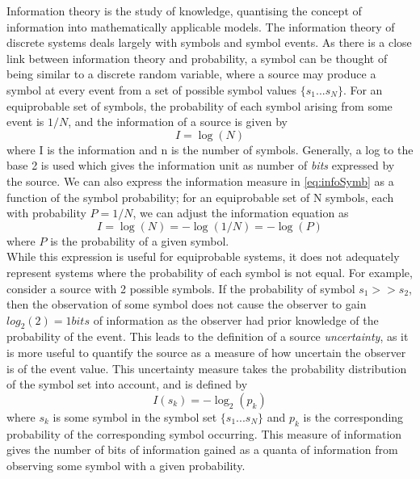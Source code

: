 Information theory is the study of knowledge, quantising the concept of information into mathematically applicable models. The information theory of discrete systems deals largely with symbols and symbol events. As there is a close link between information theory and probability, a symbol can be thought of being similar to a discrete random variable, where a source may produce a symbol at every event from a set of possible symbol values $\{s_{1}...s_{N}\}$. For an equiprobable set of symbols, the probability of each symbol arising from some event is $1/N$, and the information of a source is given by 
\begin{equation}
    \label{eq:infoSymb}
    I = \log(N)
\end{equation}
where I is the information and n is the number of symbols. Generally, a log to the base 2 is used which gives the information unit as number of \emph{bits} expressed by the source. We can also express the information measure in \ref{eq:infoSymb} as a function of the symbol probability; for an equiprobable set of N symbols, each with probability $P = 1/N$, we can adjust the information equation as
\begin{equation}
    \label{eq:infoEquiProb}
    I = \log(N) = -\log(1/N) = -\log(P) 
\end{equation}
where $P$ is the probability of a given symbol.\\
While this expression is useful for equiprobable systems, it does not adequately represent systems where the probability of each symbol is not equal. For example, consider a source with 2 possible symbols. If the probability of symbol $s_{1} >> s_{2}$, then the observation of some symbol does not cause the observer to gain $log_{2}(2) = 1 bits$ of information as the observer had prior knowledge of the probability of the event. This leads to the definition of a source \emph{uncertainty}, as it is more useful to quantify the source as a measure of how uncertain the observer is of the event value. This uncertainty measure takes the probability distribution of the symbol set into account, and is defined by
\begin{equation}
    \label{eq:uncertProb}
    I(s_{k}) = -\log_{2}(p_{k})
\end{equation}
where $s_{k}$ is some symbol in the symbol set $\{s_{1}...s_{N}\}$ and $p_{k}$ is the corresponding probability of the corresponding symbol occurring. This measure of information gives the number of bits of information gained as a quanta of information from observing some symbol with a given probability.\\
